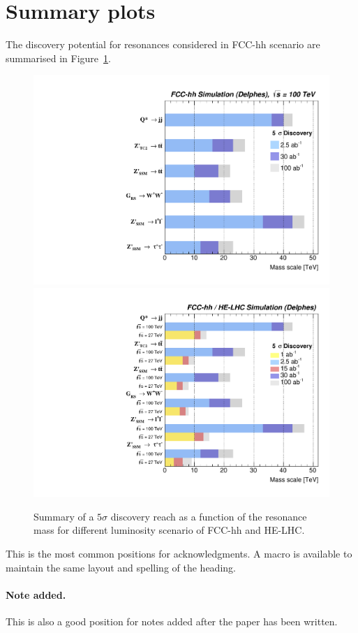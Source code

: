 \documentclass[a4paper,11pt]{article}
\begin{document}
\section{Summary plots}
The discovery potential for resonances considered in FCC-hh scenario are summarised in Figure~\ref{figure:resonances100:summary}.
\begin{figure}[!htb]
  \centering
  \includegraphics[width=0.45\columnwidth]{Fig/summaryDisco_onlyFCChh.pdf}
    \includegraphics[width=0.45\columnwidth]{Fig/summaryDisco.pdf}

  \caption{Summary of a $5\sigma$ discovery reach as a function of the resonance mass for different luminosity scenario of FCC-hh and HE-LHC.}
  \label{figure:resonances100:summary}
\end{figure}


\acknowledgments

This is the most common positions for acknowledgments. A macro is
available to maintain the same layout and spelling of the heading.

\paragraph{Note added.} This is also a good position for notes added
after the paper has been written.










\end{document}

